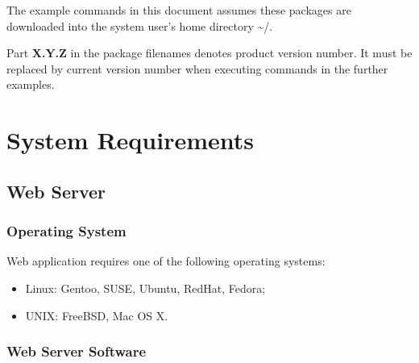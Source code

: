 \documentclass[12pt]{article}
\newcommand{\vigReleasePath}{\textasciitilde/}
\newcommand{\vigReleaseVersion}{X.Y.Z}
\begin{document}
The example commands in this document assumes these packages are downloaded into the system user's home directory \textsf{{\vigReleasePath}}.

Part \textbf{\vigReleaseVersion} in the package filenames denotes product version number. It must be replaced by current version number when executing commands in the further examples.

\section{System Requirements}

\subsection{Web Server}

\subsubsection{Operating System}
Web application requires one of the following operating systems:
\begin{itemize}
	\item Linux: Gentoo, SUSE, Ubuntu, RedHat, Fedora;
	\item UNIX: FreeBSD, Mac OS X.
\end{itemize}

\subsubsection{Web Server Software}
\end{document}
